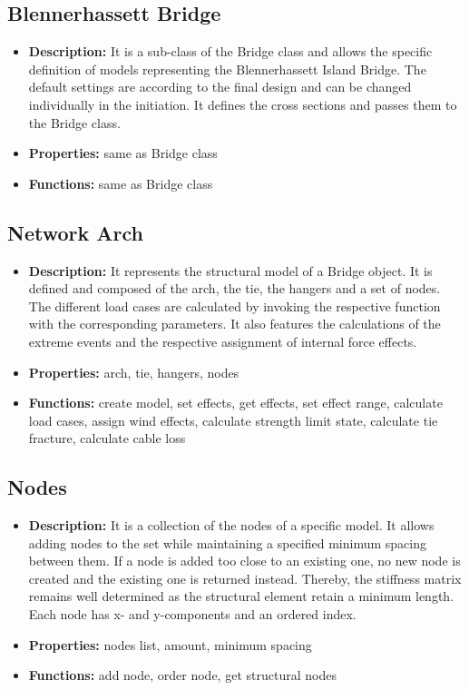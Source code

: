 \subsection*{Blennerhassett Bridge}
\begin{itemize}
    \item {\bf Description:} It is a sub-class of the Bridge class and allows the specific definition of models representing the Blennerhassett Island Bridge. The default settings are according to the final design and can be changed individually in the initiation. It defines the cross sections and passes them to the Bridge class.
    \item {\bf Properties:} same as Bridge class
    \item {\bf Functions:} same as Bridge class
\end{itemize}

\subsection*{Network Arch}
\begin{itemize}
    \item {\bf Description:} It represents the structural model of a Bridge object. It is defined and composed of the arch, the tie, the hangers and a set of nodes. The different load cases are calculated by invoking the respective function with the corresponding parameters. It also features the calculations of the extreme events and the respective assignment of internal force effects.
    \item {\bf Properties:} arch, tie, hangers, nodes
    \item {\bf Functions:} create model, set effects, get effects, set effect range, calculate load cases, assign wind effects, calculate strength limit state, calculate tie fracture, calculate cable loss
\end{itemize}

\subsection*{Nodes}
\begin{itemize}
    \item {\bf Description:} It is a collection of the nodes of a specific model. It allows adding nodes to the set while maintaining a specified minimum spacing between them. If a node is added too close to an existing one, no new node is created and the existing one is returned instead. Thereby, the stiffness matrix remains well determined as the structural element retain a minimum length. Each node has x- and y-components and an ordered index.
    \item {\bf Properties:} nodes list, amount, minimum spacing
    \item {\bf Functions:} add node, order node, get structural nodes
\end{itemize}

